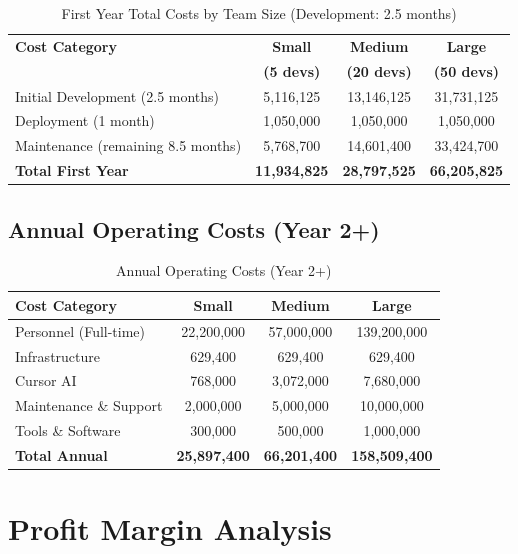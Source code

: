 \documentclass[12pt,a4paper]{article}
\begin{document}
\begin{table}[H]
\centering
\begin{tabular}{|l|c|c|c|}
\hline
\textbf{Cost Category} & \textbf{Small} & \textbf{Medium} & \textbf{Large} \\
 & \textbf{(5 devs)} & \textbf{(20 devs)} & \textbf{(50 devs)} \\
\hline
Initial Development (2.5 months) & 5,116,125 & 13,146,125 & 31,731,125 \\
Deployment (1 month) & 1,050,000 & 1,050,000 & 1,050,000 \\
Maintenance (remaining 8.5 months) & 5,768,700 & 14,601,400 & 33,424,700 \\
\hline
\textbf{Total First Year} & \textbf{11,934,825} & \textbf{28,797,525} & \textbf{66,205,825} \\
\hline
\end{tabular}
\caption{First Year Total Costs by Team Size (Development: 2.5 months)}
\end{table}

\subsection{Annual Operating Costs (Year 2+)}

\begin{table}[H]
\centering
\begin{tabular}{|l|c|c|c|}
\hline
\textbf{Cost Category} & \textbf{Small} & \textbf{Medium} & \textbf{Large} \\
\hline
Personnel (Full-time) & 22,200,000 & 57,000,000 & 139,200,000 \\
Infrastructure & 629,400 & 629,400 & 629,400 \\
Cursor AI & 768,000 & 3,072,000 & 7,680,000 \\
Maintenance \& Support & 2,000,000 & 5,000,000 & 10,000,000 \\
Tools \& Software & 300,000 & 500,000 & 1,000,000 \\
\hline
\textbf{Total Annual} & \textbf{25,897,400} & \textbf{66,201,400} & \textbf{158,509,400} \\
\hline
\end{tabular}
\caption{Annual Operating Costs (Year 2+)}
\end{table}

\section{Profit Margin Analysis}
\end{document}
